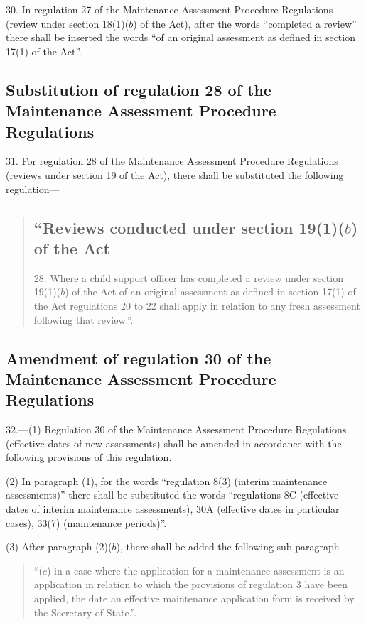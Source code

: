 \documentclass[a4paper]{article}
\begin{document}
30.  In regulation 27 of the Maintenance Assessment Procedure Regulations (review under section 18(1)($b$) of the Act), after the words “completed a review” there shall be inserted the words “of an original assessment as defined in section 17(1) of the Act”.

\subsection[31. Substitution of regulation 28 of the Maintenance Assessment Procedure Regulations]{Substitution of regulation 28 of the Maintenance Assessment Procedure Regulations}

31.  For regulation 28 of the Maintenance Assessment Procedure Regulations (reviews under section 19 of the Act), there shall be substituted the following regulation—
\begin{quotation}
\subsection*{“Reviews conducted under section 19(1)($b$) of the Act}

28.  Where a child support officer has completed a review under section 19(1)($b$) of the Act of an original assessment as defined in section 17(1) of the Act regulations 20 to 22 shall apply in relation to any fresh assessment following that review.”.
\end{quotation}

\subsection[32. Amendment of regulation 30 of the Maintenance Assessment Procedure Regulations]{Amendment of regulation 30 of the Maintenance Assessment Procedure Regulations}

32.—(1) Regulation 30 of the Maintenance Assessment Procedure Regulations (effective dates of new assessments) shall be amended in accordance with the following provisions of this regulation.

(2) In paragraph (1), for the words “regulation 8(3) (interim maintenance assessments)” there shall be substituted the words “regulations 8C (effective dates of interim maintenance assessments), 30A (effective dates in particular cases), 33(7) (maintenance periods)”.

(3) After paragraph (2)($b$), there shall be added the following sub-\hspace{0pt}paragraph—
\begin{quotation}
“($c$) in a case where the application for a maintenance assessment is an application in relation to which the provisions of regulation 3 have been applied, the date an effective maintenance application form is received by the Secretary of State.”.
\end{quotation}
\end{document}
